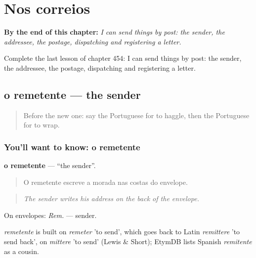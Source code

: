 
\chapter{Nos correios}
\label{ch:pt-nos-correios}

\begin{chapteropening}
\textbf{By the end of this chapter:} \emph{I can send things by post: the sender, the addressee, the postage, dispatching and registering a letter.}

Complete the last lesson of chapter 454: I can send things by post: the sender, the addressee, the postage, dispatching and registering a letter.
\end{chapteropening}

\section[o remetente]{o remetente — the sender}

\label{lesson:PT-C454-remetente}



\begin{quote}
Before the new one: say the Portuguese for to haggle, then the Portuguese for to wrap.
\end{quote}

\subsection*{You'll want to know: o remetente}
\textbf{o remetente} — \textquotedblleft{}the sender\textquotedblright{}.

\begin{quote}
O remetente escreve a morada nas costas do envelope.
\end{quote}

\begin{quote}
\emph{The sender writes his address on the back of the envelope.}
\end{quote}

On envelopes: \emph{Rem.} — sender.

\begin{cousinweb}
\emph{remetente} is built on \emph{remeter} 'to send', which goes back to Latin \emph{remittere} 'to send back', on \emph{mittere} 'to send' (Lewis \& Short); EtymDB lists Spanish \emph{remitente} as a cousin.
\end{cousinweb}

